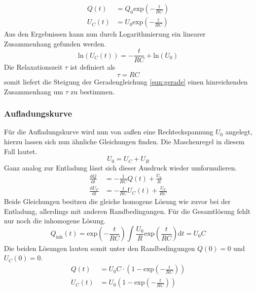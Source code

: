 \begin{align*}
    Q(t) &= Q_{0}\text{exp}\left(- \frac{t}{RC}\right) \\
    U_{C}(t) &= U_{0} \text{exp}\left(- \frac{t}{RC}\right)
\end{align*}
Aus den Ergebnissen kann nun durch Logarithmierung ein linearer Zusammenhang gefunden werden.
\begin{equation}
    \label{eqn:gerade}
\text{ln}(U_{C}(t)) = -\frac{t}{RC} + \text{ln}(U_{0})
\end{equation}
Die Relaxationszeit $\tau$ ist definiert als
\begin{equation*}
\tau = RC
\end{equation*}
somit liefert die Steigung der Geradengleichung \eqref{eqn:gerade} einen hinreichenden Zusammenhang um $\tau$ zu bestimmen.
\subsubsection{Aufladungskurve}
Für die Aufladungskurve wird nun von außen eine Rechteckspannung $U_{0}$ angelegt, hierzu lassen sich nun ähnliche Gleichungen finden.
Die Maschenregel in diesem Fall lautet.
\begin{equation}
    \label{eqn:masche2}
    U_{0} = U_{C} + U_{R}
\end{equation}
Ganz analog zur Entladung lässt sich dieser Ausdruck wieder umformulieren.
\begin{align*}
    \frac{\text{d}Q}{\text{d}t} &= - \frac{1}{RC} Q(t) + \frac{U_{0}}{R} \\
    \frac{\text{d}U_{C}}{\text{d}t} &= - \frac{1}{RC} U_{C}(t) + \frac{U_{0}}{RC}
\end{align*}
Beide Gleichungen besitzen die gleiche homogene Lösung wie zuvor bei der Entladung, allerdings mit anderen Randbedingungen. Für die Gesamtlösung fehlt nur noch die inhomogene Lösung.
\begin{equation*}
Q_{\text{inh}}(t) = \text{exp}\left( - \frac{t}{RC}\right) \int_{}^{} \frac{U_{0}}{R} \text{exp}\left(\frac{t}{RC}\right) \text{d}t = U_{0}C
\end{equation*}
Die beiden Lösungen lauten somit unter den Randbedingungen $Q(0) = 0$ und $U_{C}(0)= 0$.
\begin{align*}
    Q(t) &= U_{0}C \cdot \left( 1 - \text{exp}\left(- \frac{t}{RC}\right) \right)\\
    U_{C}(t) &= U_{0} \left( 1 - \text{exp}\left(- \frac{t}{RC}\right)\right)
\end{align*}
